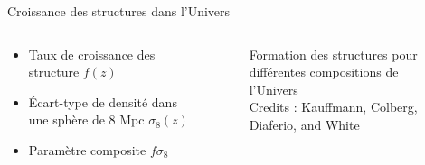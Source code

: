 \documentclass{beamer}
\newcommand{\credits}[1]{\tiny Credits : #1}
\begin{document}
\begin{frame}{Croissance des structures dans l'Univers}
\begin{columns}
\begin{column}{.4\textwidth}
\begin{itemize}
\item<1-> Taux de croissance des structure $f(z)$
\item<2-> Écart-type de densité dans une sphère de 8 Mpc \textcolor{deepgreen}{$\sigma_8(z)$}
\item<3> Paramètre composite $f\sigma_8$
\end{itemize}
\end{column}
\begin{column}{.6\textwidth}
	\begin{figure}
		\centering
		\caption{Formation des structures pour différentes compositions de l'Univers\\ \credits{Kauffmann, Colberg, Diaferio, and White}}
	\end{figure}
\end{column}
\end{columns}
\end{frame}
\end{document}

